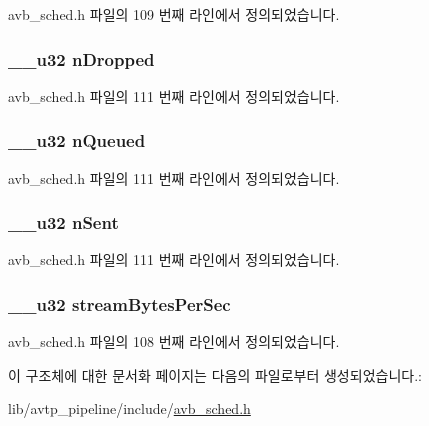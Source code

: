 avb\+\_\+sched.\+h 파일의 109 번째 라인에서 정의되었습니다.

\subsubsection[{\texorpdfstring{n\+Dropped}{nDropped}}]{\setlength{\rightskip}{0pt plus 5cm}\+\_\+\+\_\+u32 n\+Dropped}\hypertarget{structtc__avb__sopt_a55fc6074022d98844a289c91c5d5e429}{}\label{structtc__avb__sopt_a55fc6074022d98844a289c91c5d5e429}


avb\+\_\+sched.\+h 파일의 111 번째 라인에서 정의되었습니다.

\subsubsection[{\texorpdfstring{n\+Queued}{nQueued}}]{\setlength{\rightskip}{0pt plus 5cm}\+\_\+\+\_\+u32 n\+Queued}\hypertarget{structtc__avb__sopt_ae5bbd9d9c91d96bddeb63b225c76cda3}{}\label{structtc__avb__sopt_ae5bbd9d9c91d96bddeb63b225c76cda3}


avb\+\_\+sched.\+h 파일의 111 번째 라인에서 정의되었습니다.

\subsubsection[{\texorpdfstring{n\+Sent}{nSent}}]{\setlength{\rightskip}{0pt plus 5cm}\+\_\+\+\_\+u32 n\+Sent}\hypertarget{structtc__avb__sopt_ab6313c3491e913dca3d52031097a17e1}{}\label{structtc__avb__sopt_ab6313c3491e913dca3d52031097a17e1}


avb\+\_\+sched.\+h 파일의 111 번째 라인에서 정의되었습니다.

\subsubsection[{\texorpdfstring{stream\+Bytes\+Per\+Sec}{streamBytesPerSec}}]{\setlength{\rightskip}{0pt plus 5cm}\+\_\+\+\_\+u32 stream\+Bytes\+Per\+Sec}\hypertarget{structtc__avb__sopt_ab6397ebcd88d6d7dbb661a94bd248894}{}\label{structtc__avb__sopt_ab6397ebcd88d6d7dbb661a94bd248894}


avb\+\_\+sched.\+h 파일의 108 번째 라인에서 정의되었습니다.



이 구조체에 대한 문서화 페이지는 다음의 파일로부터 생성되었습니다.\+:\begin{DoxyCompactItemize}
\item 
lib/avtp\+\_\+pipeline/include/\hyperlink{avb__sched_8h}{avb\+\_\+sched.\+h}\end{DoxyCompactItemize}
